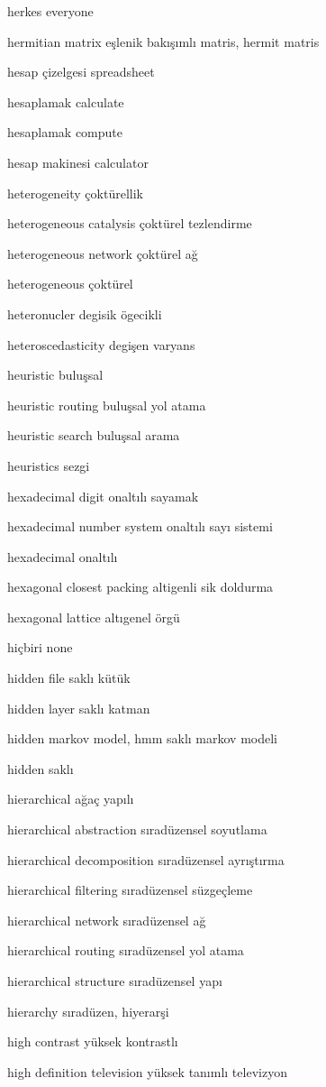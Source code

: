 \documentclass[12pt,fleqn]{article}\usepackage{../../common}
\begin{document}
herkes everyone

hermitian matrix eşlenik bakışımlı matris, hermit matris

hesap çizelgesi spreadsheet

hesaplamak calculate

hesaplamak compute

hesap makinesi calculator

heterogeneity çoktürellik

heterogeneous catalysis çoktürel tezlendirme

heterogeneous network çoktürel ağ

heterogeneous çoktürel

heteronucler degisik ögecikli

heteroscedasticity degişen varyans

heuristic buluşsal

heuristic routing buluşsal yol atama

heuristic search buluşsal arama

heuristics sezgi

hexadecimal digit onaltılı sayamak

hexadecimal number system onaltılı sayı sistemi

hexadecimal onaltılı

hexagonal closest packing altigenli sik doldurma

hexagonal lattice altıgenel örgü

hiçbiri none

hidden file saklı kütük

hidden layer saklı katman

hidden markov model, hmm saklı markov modeli

hidden saklı

hierarchical ağaç yapılı

hierarchical abstraction sıradüzensel soyutlama

hierarchical decomposition sıradüzensel ayrıştırma

hierarchical filtering sıradüzensel süzgeçleme

hierarchical network sıradüzensel ağ

hierarchical routing sıradüzensel yol atama

hierarchical structure sıradüzensel yapı

hierarchy sıradüzen, hiyerarşi

high contrast yüksek kontrastlı

high definition television yüksek tanımlı televizyon
\end{document}
